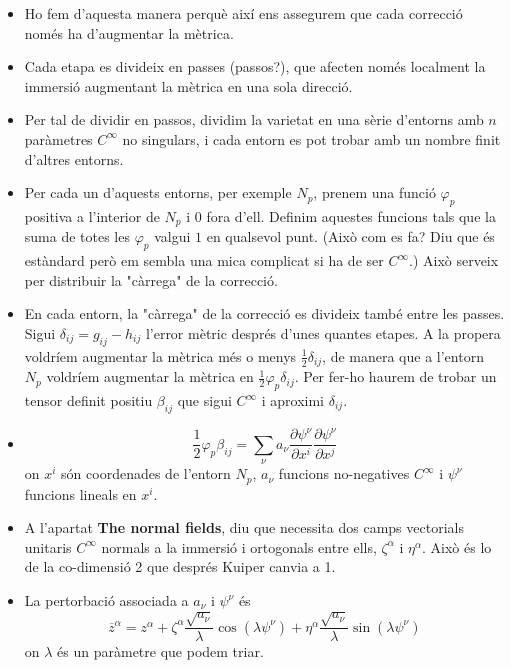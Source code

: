 {\begin{itemize}
    $$g_{ij}-\overline{h_{ij}}\approx \frac12(g_{ij}-h_{ij})$$
    \item Ho fem d'aquesta manera perquè així ens assegurem que cada correcció només ha d'augmentar la mètrica. 
    \item Cada etapa es divideix en passes (passos?), que afecten només localment la immersió augmentant la mètrica en una sola direcció. 
    \item Per tal de dividir en passos, dividim la varietat en una sèrie d'entorns amb $n$ paràmetres $C^\infty$ no singulars, i cada entorn es pot trobar amb un nombre finit d'altres entorns.
    \item Per cada un d'aquests entorns, per exemple $N_p$, prenem una funció $\varphi_p$ positiva a l'interior de $N_p$ i $0$ fora d'ell. Definim aquestes funcions tals que la suma de totes les $\varphi_p$ valgui $1$ en qualsevol punt. (Això com es fa? Diu que és estàndard però em sembla una mica complicat si ha de ser $C^\infty$.) Això serveix per distribuir la "càrrega" de la correcció.
    \item En cada entorn, la "càrrega" de la correcció es divideix també entre les passes. Sigui $\delta_{ij}=g_{ij}-h_{ij}$ l'error mètric després d'unes quantes etapes. A la propera voldríem augmentar la mètrica més o menys $\frac12\delta_{ij}$, de manera que a l'entorn $N_p$ voldríem augmentar la mètrica en $\frac12\varphi_p\delta_{ij}$. Per fer-ho haurem de trobar un tensor definit positiu $\beta_{ij}$ que sigui $C^\infty$ i aproximi $\delta_{ij}$.
    \item $$\frac12\varphi_p\beta_{ij} = \sum_{\nu}a_{\nu}\frac{\partial\psi^\nu}{\partial x^i}\frac{\partial\psi^\nu}{\partial x^j}$$ on $x^i$ són coordenades de l'entorn $N_p$, $a_\nu$ funcions no-negatives $C^\infty$ i $\psi^\nu$ funcions lineals en $x^i$.
    \item A l'apartat \textbf{The normal fields}, diu que necessita dos camps vectorials unitaris $C^\infty$ normals a la immersió i ortogonals entre ells, $\zeta^\alpha$ i $\eta^\alpha$. Això és lo de la co-dimensió 2 que després Kuiper canvia a 1.
    \item La pertorbació associada a $a_\nu$ i $\psi^\nu$ és 
        \begin{equation}
            \boxed{\overline{z}^\alpha = z^\alpha + \zeta^\alpha\frac{\sqrt{a_\nu}}{\lambda}\cos(\lambda \psi^\nu) + \eta^\alpha\frac{\sqrt{a_\nu}}{\lambda}\sin(\lambda \psi^\nu)}
        \end{equation}
        on $\lambda$ és un paràmetre que podem triar.

\end{itemize}}
